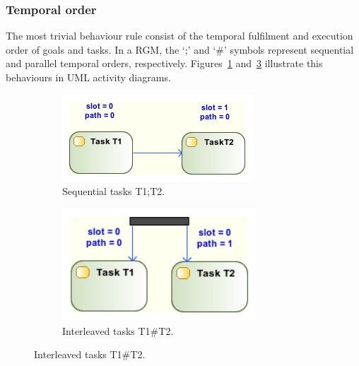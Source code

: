 \subsubsection{Temporal order}

The most trivial behaviour rule consist of the temporal fulfilment and execution order of goals and tasks. In a RGM, the `;' and `\#' symbols represent sequential and parallel temporal orders, respectively. Figures~\ref{fig:UML_SEQ_TSKS} and~\ref{fig:UML_PAR_TSKS} illustrate this behaviours in UML activity diagrams.

\begin{figure}[ht!]
        \centering
        \begin{subfigure}[b]{0.4\textwidth}
                \includegraphics[width=\textwidth]{imgs/UML_SEQ_TSKS.png}
				\caption{Sequential tasks T1;T2.}
				\label{fig:UML_SEQ_TSKS}
        \end{subfigure}        
        \quad %
        \begin{subfigure}[b]{0.4\textwidth}                
                \includegraphics[width=0.8\textwidth]{imgs/UML_PAR_TSKS.png}
				\caption{Interleaved tasks T1\#T2.}
				\label{fig:UML_PAR_TSKS}
        \end{subfigure}%
          
\end{figure}

